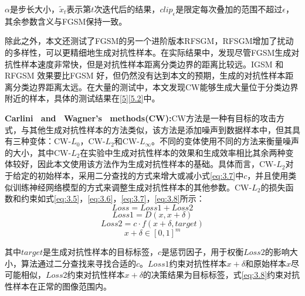 \noindent $\alpha$是步长大小，$\tilde{x}_t$表示第$t$次迭代后的结果，$clip_{\epsilon}$是限定每次叠加的范围不超过$\epsilon$，其余参数含义与FGSM保持一致。

除此之外，本文还测试了FGSM的另一个进阶版本RFSGM\cite{tramer2017ensemble}，RFSGM增加了扰动的多样性，可以更精细地生成对抗性样本。在实际结果中，发现尽管FGSM生成对抗性样本速度非常快，但是对抗性样本距离分类边界的距离比较远。IGSM 和RFGSM 效果要比FGSM 好，但仍然没有达到本文的预期，生成的对抗性样本距离分类边界距离太远。在大量的测试中，本文发现CW能够生成大量位于分类边界附近的样本，具体的测试结果在\ref{5}\ref{5.2}中。

\noindent\textbf{Carlini \ and \ Wagner's \ methods(CW):}CW\cite{carlini2017towards}方法是一种有目标的攻击方式，与其他生成对抗性样本的方法类似，该方法是添加噪声到数据样本中，但其具有三种变体：CW-$L_0$，CW-$L_2$和CW-$L_{\infty}$。不同的变体使用不同的方法来衡量噪声的大小，其中CW-$L_2$在实验中生成对抗性样本的效果和生成效率相比其余两种变体较好，因此本文使用该方法作为生成对抗性样本的基础。具体而言，CW-$L_2$对于给定的初始样本，采用二分查找的方式来增大或减小式\ref{eq:3.7}中$c$，并且使用类似训练神经网络模型的方式来调整生成对抗性样本的其他参数。CW-$L_2$的损失函数和约束如式\ref{eq:3.5}，\ref{eq:3.6}，\ref{eq:3.7}，\ref{eq:3.8}所示：
\begin{equation}
	\label{eq:3.5}
	Loss = Loss1 + Loss2 
\end{equation}
\begin{equation}
	\label{eq:3.6}
	Loss1 = D(x, x + \delta)
\end{equation}
\begin{equation}
	\label{eq:3.7}
	Loss2 = c \cdot f(x + \delta,target)
\end{equation}
\begin{equation}
	\label{eq:3.8}
	x + \delta \in [0,1]^m
\end{equation}

其中$target$是生成对抗性样本的目标标签，$c$是惩罚因子，用于权衡$Loss2$的影响大小，算法通过二分查找来寻找合适的$c$。$Loss1$约束对抗性样本$x + \delta$和原始样本$x$尽可能相似，$Loss2$约束对抗性样本$x + \delta$的决策结果为目标标签，式\ref{eq:3.8}约束对抗性样本在正常的图像范围内。

